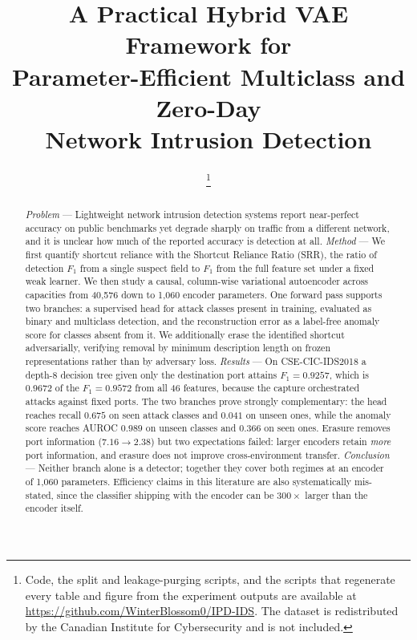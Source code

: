 \documentclass[conference]{IEEEtran}
\newcommand{\SRRport}{0.9257}
\newcommand{\SRRall}{0.9572}
\newcommand{\SRRratio}{0.9672}
\newcommand{\paramsXS}{1{,}060}
\newcommand{\paramsL}{40{,}576}
\begin{document}
\title{A Practical Hybrid VAE Framework for\\
Parameter-Efficient Multiclass and Zero-Day\\
Network Intrusion Detection}

\author{%
%
\thanks{Code, the split and leakage-purging scripts, and the scripts that regenerate every
table and figure from the experiment outputs are available at
\url{https://github.com/WinterBlossom0/IPD-IDS}. The dataset is redistributed by the
Canadian Institute for Cybersecurity and is not included.}%
}

\maketitle

\begin{abstract}
\textit{Problem} --- Lightweight network intrusion detection systems report near-perfect
accuracy on public benchmarks yet degrade sharply on traffic from a different network, and
it is unclear how much of the reported accuracy is detection at all.
\textit{Method} --- We first quantify shortcut reliance with the Shortcut Reliance Ratio
(SRR), the ratio of detection $F_1$ from a single suspect field to $F_1$ from the full
feature set under a fixed weak learner. We then study a causal, column-wise variational
autoencoder across capacities from \paramsL{} down to \paramsXS{} encoder parameters. One
forward pass supports two branches: a supervised head for attack classes present in
training, evaluated as binary and multiclass detection, and the reconstruction error as a
label-free anomaly score for classes absent from it. We additionally erase the identified
shortcut adversarially, verifying removal by minimum description length on frozen
representations rather than by adversary loss.
\textit{Results} --- On CSE-CIC-IDS2018 a depth-8 decision tree given only the destination
port attains $F_1 = \SRRport$, which is \SRRratio{} of the $F_1 = \SRRall$ from all 46
features, because the capture orchestrated attacks against fixed ports. The two branches
prove strongly complementary: the head reaches recall $0.675$ on seen attack classes and
$0.041$ on unseen ones, while the anomaly score reaches AUROC $0.989$ on unseen classes and
$0.366$ on seen ones. Erasure removes port information ($7.16 \rightarrow 2.38$) but two
expectations failed: larger encoders retain \emph{more} port information, and erasure does
not improve cross-environment transfer.
\textit{Conclusion} --- Neither branch alone is a detector; together they cover both regimes
at an encoder of \paramsXS{} parameters. Efficiency claims in this literature are also
systematically mis-stated, since the classifier shipping with the encoder can be $300\times$
larger than the encoder itself.
\end{abstract}
\end{document}
